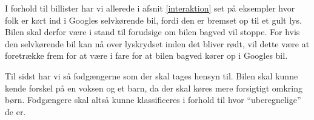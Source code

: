 I forhold til billister har vi allerede i afsnit \ref{interaktion} set på eksempler hvor folk er kørt ind i Googles selvkørende bil, fordi den er bremset op til et gult lys. Bilen skal derfor være i stand til forudsige om bilen bagved vil stoppe. For hvis den selvkørende bil kan nå over lyskrydset inden det bliver rødt, vil dette være at foretrække frem for at være i fare for at bilen bagved kører op i Googles bil.

Til sidst har vi så fodgængerne som der skal tages hensyn til. Bilen skal kunne kende forskel på en voksen og et barn, da der skal køres mere forsigtigt omkring børn. Fodgængere skal altså kunne klassificeres i forhold til hvor ``uberegnelige'' de er. 